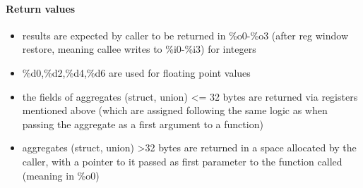 \paragraph{Return values}

\begin{itemize}
\item results are expected by caller to be returned in \%o0-\%o3 (after reg window restore, meaning callee writes to \%i0-\%i3) for integers
\item \%d0,\%d2,\%d4,\%d6 are used for floating point values
\item the fields of aggregates (struct, union) \textless= 32 bytes are returned via registers mentioned above (which are
assigned following the same logic as when passing the aggregate as a first argument to a function)
\item aggregates (struct, union) \textgreater 32 bytes are returned in a space allocated by the caller, with a pointer to it
passed as first parameter to the function called (meaning in \%o0)
%
%
\end{itemize}

